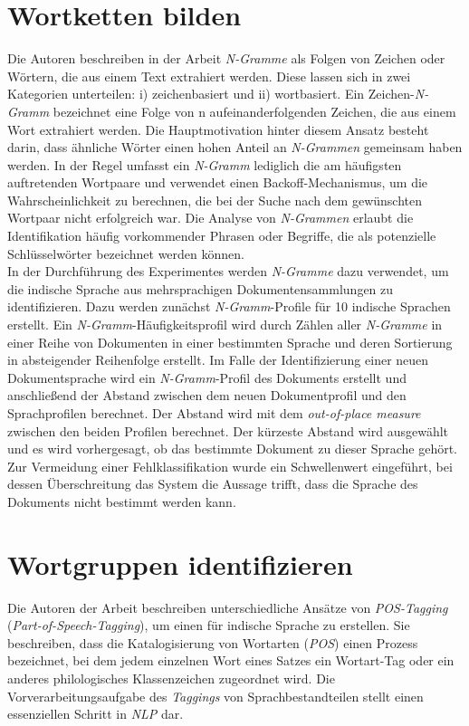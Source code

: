 \section{Wortketten bilden}
Die Autoren \citeauthor{majumder2002n} beschreiben in der Arbeit \cite{majumder2002n} \emph{N-Gramme} als Folgen von Zeichen oder Wörtern, die aus einem Text extrahiert werden. Diese lassen sich in zwei Kategorien unterteilen: i) zeichenbasiert und ii) wortbasiert. Ein Zeichen-\emph{N-Gramm} bezeichnet eine Folge von n aufeinanderfolgenden Zeichen, die aus einem Wort extrahiert werden. Die Hauptmotivation hinter diesem Ansatz besteht darin, dass ähnliche Wörter einen hohen Anteil an \emph{N-Grammen} gemeinsam haben werden. In der Regel umfasst ein \emph{N-Gramm} lediglich die am häufigsten auftretenden Wortpaare und verwendet einen Backoff-Mechanismus, um die Wahrscheinlichkeit zu berechnen, die bei der Suche nach dem gewünschten Wortpaar nicht erfolgreich war. Die Analyse von \emph{N-Grammen} erlaubt die Identifikation häufig vorkommender Phrasen oder Begriffe, die als potenzielle Schlüsselwörter bezeichnet werden können.\\
In der Durchführung des Experimentes werden \emph{N-Gramme} dazu verwendet, um die indische Sprache aus mehrsprachigen Dokumentensammlungen zu identifizieren. Dazu werden zunächst \emph{N-Gramm}-Profile für 10 indische Sprachen erstellt. Ein \emph{N-Gramm}-Häufigkeitsprofil wird durch Zählen aller \emph{N-Gramme} in einer Reihe von Dokumenten in einer bestimmten Sprache und deren Sortierung in absteigender Reihenfolge erstellt. Im Falle der Identifizierung einer neuen Dokumentsprache wird ein \emph{N-Gramm}-Profil des Dokuments erstellt und anschließend der Abstand zwischen dem neuen Dokumentprofil und den Sprachprofilen berechnet. Der Abstand wird mit dem \emph{out-of-place measure} zwischen den beiden Profilen berechnet. Der kürzeste Abstand wird ausgewählt und es wird vorhergesagt, ob das bestimmte Dokument zu dieser Sprache gehört. Zur Vermeidung einer Fehlklassifikation wurde ein Schwellenwert eingeführt, bei dessen Überschreitung das System die Aussage trifft, dass die Sprache des Dokuments nicht bestimmt werden kann.
\section{Wortgruppen identifizieren}
Die Autoren \citeauthor{kumawat2015pos} der Arbeit \cite{kumawat2015pos} beschreiben unterschiedliche Ansätze von \emph{POS-Tagging} (\emph{Part-of-Speech-Tagging}), um einen für indische Sprache zu erstellen. Sie beschreiben, dass die Katalogisierung von Wortarten (\emph{POS}) einen Prozess bezeichnet, bei dem jedem einzelnen Wort eines Satzes ein Wortart-Tag oder ein anderes philologisches Klassenzeichen zugeordnet wird. Die Vorverarbeitungsaufgabe des \emph{Taggings} von Sprachbestandteilen stellt einen essenziellen Schritt in \emph{NLP} dar.\\

